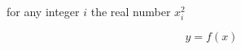 \documentclass[a4paper]{article}
\begin{document}


for any integer $i$ the real number $x_i^2$

\begin{equation}
    y=f(x)
\end{equation}
\end{document}
